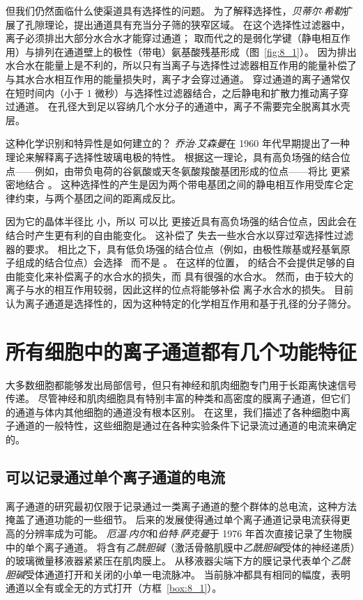 但我们仍然面临什么使渠道具有选择性的问题。
为了解释选择性，\textit{贝蒂尔$\cdot$希勒}扩展了孔隙理论，提出通道具有充当分子筛的狭窄区域。
在这个选择性过滤器中，离子必须排出大部分水合水才能穿过通道；
取而代之的是弱化学键（静电相互作用）与排列在通道壁上的极性（带电）氨基酸残基形成（图~\ref{fig:8_1}）。
因为排出水合水在能量上是不利的，所以只有当离子与选择性过滤器相互作用的能量补偿了与其水合水相互作用的能量损失时，离子才会穿过通道。
穿过通道的离子通常仅在短时间内（小于 1 微秒）与选择性过滤器结合，之后静电和扩散力推动离子穿过通道。
在孔径大到足以容纳几个水分子的通道中，离子不需要完全脱离其水壳层。


这种化学识别和特异性是如何建立的？
\textit{乔治$\cdot$艾森曼}在 1960 年代早期提出了一种理论来解释离子选择性玻璃电极的特性。
根据这一理论，具有高负场强的结合位点——例如，由带负电荷的谷氨酸或天冬氨酸羧酸基团形成的位点——将比  更紧密地结合 。
这种选择性的产生是因为两个带电基团之间的静电相互作用受库仑定律约束，与两个基团之间的距离成反比。


因为它的晶体半径比  小，所以  可以比  更接近具有高负场强的结合位点，因此会在结合时产生更有利的自由能变化。
这补偿了  失去一些水合水以穿过窄选择性过滤器的要求。
相比之下，具有低负场强的结合位点（例如，由极性羰基或羟基氧原子组成的结合位点）会选择~ 而不是 。
在这样的位置， 的结合不会提供足够的自由能变化来补偿离子的水合水的损失，而  具有很强的水合水。
然而，由于较大的  离子与水的相互作用较弱，因此这样的位点将能够补偿  离子水合水的损失。
目前认为离子通道是选择性的，因为这种特定的化学相互作用和基于孔径的分子筛分。



\section{所有细胞中的离子通道都有几个功能特征}

大多数细胞都能够发出局部信号，但只有神经和肌肉细胞专门用于长距离快速信号传递。
尽管神经和肌肉细胞具有特别丰富的种类和高密度的膜离子通道，但它们的通道与体内其他细胞的通道没有根本区别。
在这里，我们描述了各种细胞中离子通道的一般特性，这些细胞是通过在各种实验条件下记录流过通道的电流来确定的。



\subsection{可以记录通过单个离子通道的电流}

离子通道的研究最初仅限于记录通过一类离子通道的整个群体的总电流，这种方法掩盖了通道功能的一些细节。
后来的发展使得通过单个离子通道记录电流获得更高的分辨率成为可能。
\textit{厄温$\cdot$内尔}和\textit{伯特$\cdot$萨克曼}于 1976 年首次直接记录了生物膜中的单个离子通道。
将含有\textit{乙酰胆碱}（激活骨骼肌膜中\textit{乙酰胆碱}受体的神经递质）的玻璃微量移液器紧紧压在肌肉膜上。
从移液器尖端下方的膜记录代表单个\textit{乙酰胆碱}受体通道打开和关闭的小单一电流脉冲。
当前脉冲都具有相同的幅度，表明通道以全有或全无的方式打开（方框~\ref{box:8_1}）。


